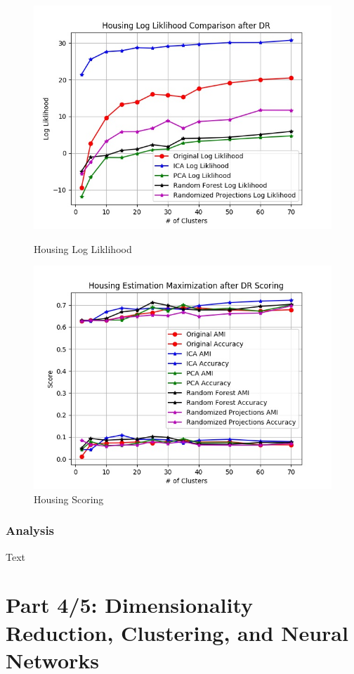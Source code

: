 \documentclass[h]{article}
\begin{document}
\begin{figure}[H]
      \includegraphics[width=1\textwidth,keepaspectratio]{housing_log_liklihood_comparison_after_dr.jpg} 
      \caption*{Housing Log Liklihood} 
   \endminipage\hfill
      \includegraphics[width=1\textwidth,keepaspectratio]{housing_estimation_maximization_after_dr_scoring.jpg} 
      \caption*{Housing Scoring} 
   \endminipage\hfill
  \end{figure}

\subsubsection*{Analysis}
Text

\section*{Part 4/5: Dimensionality Reduction, Clustering, and Neural Networks}
\end{document}
